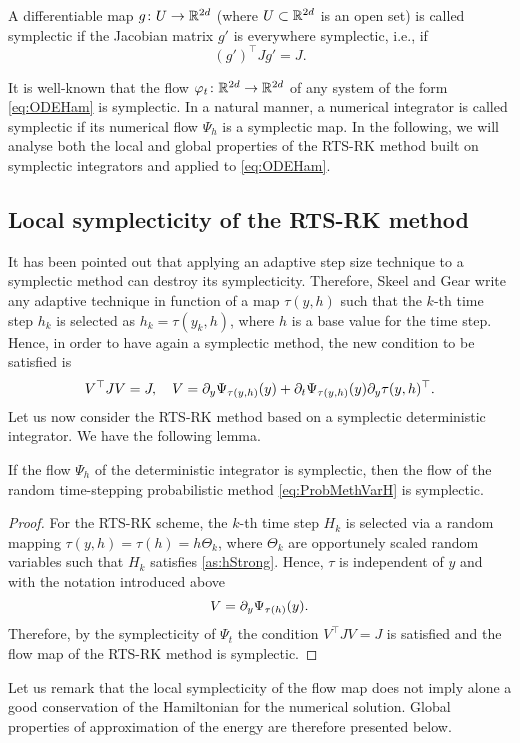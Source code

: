 \documentclass[final,onefignum,onetabnum]{siamonline171218}
\begin{document}
\begin{definition} A differentiable map $g\colon U \to \R^{2d}$ (where $U\subset \R^{2d}$ is an open set) is called symplectic if the Jacobian matrix $g'$ is everywhere symplectic, i.e., if
	\begin{equation}\label{eq:SymplecticMap}
	(g')^\top J g' = J.
	\end{equation}	
\end{definition}
It is well-known that the flow $\phi_t\colon\R^{2d}\to\R^{2d}$ of any system of the form \eqref{eq:ODEHam} is symplectic. In a natural manner, a numerical integrator is called symplectic if its numerical flow $\Psi_h$ is a symplectic map. In the following, we will analyse both the local and global properties of the RTS-RK method built on symplectic integrators and applied to \eqref{eq:ODEHam}.

\subsection{Local symplecticity of the RTS-RK method} It has been pointed out \cite{SkG92, HLW06} that applying an adaptive step size technique to a symplectic method can destroy its symplecticity. Therefore, Skeel and Gear \cite{SkG92} write any adaptive technique in function of a map $\tau(y, h)$ such that the $k$-th time step $h_k$ is selected as $h_k = \tau(y_k, h)$, where $h$ is a base value for the time step. Hence, in order to have again a symplectic method, the new condition to be satisfied is
\begin{equation}\label{eq:SymplecticCondition}
V^\top J V = J, \quad V = \pdv{\Psi_{\tau(y, h)}(y)}{y} + \pdv{\Psi_{\tau(y, h)}(y)}{t}\pdv{\tau(y, h)}{y}^\top.
\end{equation}
Let us now consider the RTS-RK method based on a symplectic deterministic integrator. We have the following lemma. 
\begin{lemma}\label{lem:SympRTSRK} If the flow $\Psi_h$ of the deterministic integrator is symplectic, then the flow of the random time-stepping probabilistic method \eqref{eq:ProbMethVarH} is symplectic.
\end{lemma}
\begin{proof} For the RTS-RK scheme, the $k$-th time step $H_k$ is selected via a random mapping $\tau(y, h) = \tau(h) = h\Theta_k$, where $\Theta_k$ are opportunely scaled random variables such that $H_k$ satisfies \cref{as:hStrong}. Hence, $\tau$ is independent of $y$ and with the notation introduced above 
	\begin{equation}
	V = \pdv{\Psi_{\tau(h)}(y)}{y}.
	\end{equation}
	Therefore, by the symplecticity of $\Psi_t$ the condition $V^\top J V = J$ is satisfied and the flow map of the RTS-RK method is symplectic.
\end{proof}
Let us remark that the local symplecticity of the flow map does not imply alone a good conservation of the Hamiltonian for the numerical solution. Global properties of approximation of the energy are therefore presented below.
\end{document}
